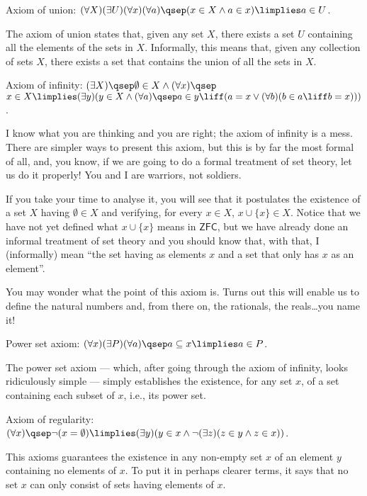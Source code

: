 \begin{para}
\begin{axioms}
\item Axiom of union: $(\forall X)(\exists U)(\forall x)(\forall a)\qsep (x\in X \land a \in x) \limplies a\in U$.
\label{union}
\end{axioms}
The axiom of union states that, given any set $X$, there exists a set $U$ containing all the elements of the sets in $X$.
Informally, this means that, given any collection of sets $X$, there exists a set that contains the union of all the sets in $X$.

\begin{axioms}
\item \label{infinity} Axiom of infinity: $(\exists X)\qsep \emptyset \in X \land (\forall x)\qsep$\\
$x\in X \limplies (\exists y)(y \in X \land (\forall a)\qsep a\in y \liff (a = x \lor (\forall b)(b\in a \liff b = x)))$.
\end{axioms}
I know what you are thinking and you are right; the axiom of infinity is a mess.
There are simpler ways to present this axiom, but this is by far the most formal of all, and, you know, if we are going to do a formal treatment of set theory, let us do it properly! You and I are warriors, not soldiers.

If you take your time to analyse it, you will see that it postulates the existence of a set $X$ having $\emptyset \in X$ and verifying, for every $x\in X$, $x\cup \{x\} \in X$.
Notice that we have not yet defined what $x\cup \{x\}$ means in $\mathsf{ZFC}$, but we have already done an informal treatment of set theory and you should know that, with that, I (informally) mean ``the set having as elements $x$ and a set that only has $x$ as an element''.

You may wonder what the point of this axiom is. Turns out this will enable us to define the natural numbers and, from there on, the rationals, the reals\ldots you name it! 

\begin{axioms}
\item Power set axiom: $(\forall x)(\exists P)(\forall a)\qsep a\subseteq x \limplies a\in P$.
\label{powerset}
\end{axioms}

The power set axiom --- which, after going through the axiom of infinity, looks ridiculously simple --- simply establishes the existence, for any set $x$, of a set containing each subset of $x$, i.e., its power set.

\begin{axioms}
\item \label{regularity} Axiom of regularity: $(\forall x)\qsep \lnot(x=\emptyset) \limplies (\exists y)(y \in x \land \lnot (\exists z) (z\in y \land z \in x))$.
\end{axioms}
This axioms guarantees the existence in any non-empty set $x$ of an element $y$ containing no elements of $x$. To put it in perhaps clearer terms, it says that no set $x$ can only consist of sets having elements of $x$.


\end{para}
